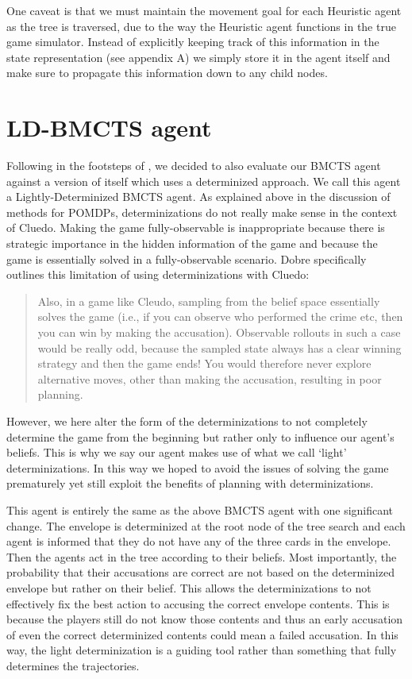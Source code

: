 \documentclass[msc, ai, logo, twoside, notimes, parskip, leftchapter, normalheadings]{infthesis}
\begin{document}
One caveat is that we must maintain the movement goal for each Heuristic agent as the tree is traversed, due to the way the Heuristic agent functions in the true game simulator. Instead of explicitly keeping track of this information in the state representation (see appendix A) we simply store it in the agent itself and make sure to propagate this information down to any child nodes.

\section{LD-BMCTS agent}
Following in the footsteps of \citep{Mihai}, we decided to also evaluate our BMCTS agent against a version of itself which uses a determinized approach. We call this agent a Lightly-Determinized BMCTS agent. As explained above in the discussion of methods for POMDPs, determinizations do not really make sense in the context of Cluedo. Making the game fully-observable is inappropriate because there is strategic importance in the hidden information of the game and because the game is essentially solved in a fully-observable scenario. Dobre specifically outlines this limitation of using determinizations with Cluedo:
\begin{quote}
Also, in a game like Cleudo, sampling from the belief space essentially solves the game (i.e., if you can observe who performed the crime etc, then you can win by making the accusation). Observable rollouts in such a case would be really odd, because the sampled state always has a clear winning strategy and then the game ends! You would therefore never explore alternative moves, other than making the accusation, resulting in poor planning. \citep{Mihai}
\end{quote}
However, we here alter the form of the determinizations to not completely determine the game from the beginning but rather only to influence our agent's beliefs. This is why we say our agent makes use of what we call `light' determinizations. In this way we hoped to avoid the issues of solving the game prematurely yet still exploit the benefits of planning with determinizations.

This agent is entirely the same as the above BMCTS agent with one significant change. The envelope is determinized at the root node of the tree search and each agent is informed that they do not have any of the three cards in the envelope. Then the agents act in the tree according to their beliefs. Most importantly, the probability that their accusations are correct are not based on the determinized envelope but rather on their belief. This allows the determinizations to not effectively fix the best action to accusing the correct envelope contents. This is because the players still do not know those contents and thus an early accusation of even the correct determinized contents could mean a failed accusation. In this way, the light determinization is a guiding tool rather than something that fully determines the trajectories.
\end{document}

